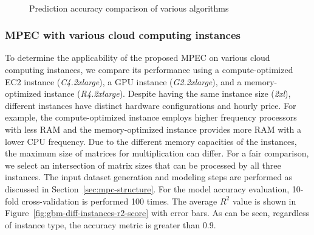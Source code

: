 \documentclass[10pt, conference, compsocconf]{IEEEtran}
\begin{document}
\begin{figure}[t]
  \centering
  \\
   \hfil {}
  \caption{\label{fig:algorithm-comparison}Prediction accuracy comparison of various algorithms}
\end{figure}

\subsubsection{MPEC with various cloud computing instances}
To determine the applicability of the proposed MPEC on various cloud computing instances, we compare its performance using a compute-optimized EC2 instance (\textit{C4.2xlarge}), a GPU instance (\textit{G2.2xlarge}), and a memory-optimized instance (\textit{R4.2xlarge}). Despite having the same instance size (\textit{2xl}), different instances have distinct hardware configurations and hourly price. For example, the compute-optimized instance employs higher frequency processors with less RAM and the memory-optimized instance provides more RAM with a lower CPU frequency. Due to the different memory capacities of the instances, the maximum size of matrices for multiplication can differ. For a fair comparison, we select an intersection of matrix sizes that can be processed by all three instances. The input dataset generation and modeling steps are performed as discussed in Section~\ref{sec:mpc-structure}. For the model accuracy evaluation, 10-fold cross-validation is performed 100 times. The average $R^2$ value is shown in Figure~\ref{fig:gbm-diff-instances-r2-score} with error bars. As can be seen, regardless of instance type, the accuracy metric is greater than $0.9$. 
\end{document}
